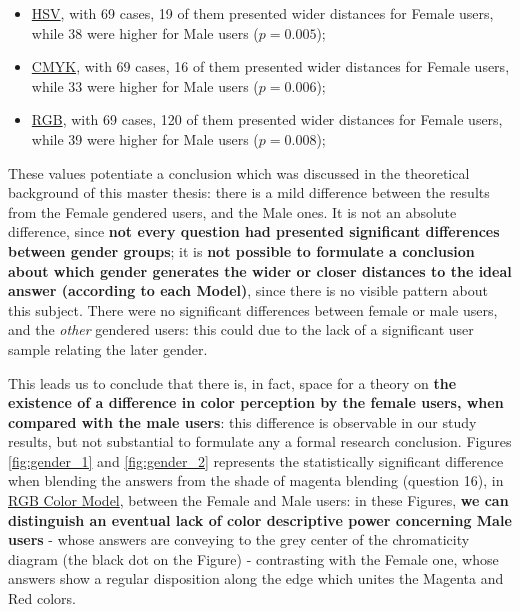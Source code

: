\begin{enumerate}
    \begin{itemize}
      \item \ul{HSV}, with 69 cases, 19 of them presented wider distances for Female users, while 38 were higher for Male users ($p = 0.005$);
      \item \ul{CMYK}, with 69 cases, 16 of them presented wider distances for Female users, while 33 were higher for Male users ($p = 0.006$);
      \item \ul{RGB}, with 69 cases, 120 of them presented wider distances for Female users, while 39 were higher for Male users ($p = 0.008$);
    \end{itemize}
\end{enumerate} \par
%
These values potentiate a conclusion which was discussed in the theoretical background of this master thesis: there is a mild difference between the results from the Female gendered users, and the Male ones. It is not an absolute difference, since \textbf{not every question had presented significant
differences between gender groups}; it is \textbf{not possible to formulate a conclusion about which gender generates the wider or closer distances to the ideal answer (according to each Model)}, since there is no visible pattern about this subject. There were no significant differences between female
or male users, and the \emph{other} gendered users: this could due to the lack of a significant user sample relating the later gender. \par
%
This leads us to conclude that there is, in fact, space for a theory on \textbf{the existence of a difference in color perception by the female users, when compared with the male users}: this difference is observable in our study results, but not substantial to formulate any a formal research conclusion.
Figures \ref{fig:gender_1} and \ref{fig:gender_2} represents the statistically significant difference when blending the answers from the shade of magenta blending (question 16), in \ul{RGB Color Model}, between the Female and Male users: in these Figures, \textbf{we can distinguish an eventual lack of color
descriptive power concerning Male users} - whose answers are conveying to the grey center of the chromaticity diagram (the black dot on the Figure) - contrasting with the Female one, whose answers show a regular disposition along the edge which unites the Magenta and Red colors.
%
